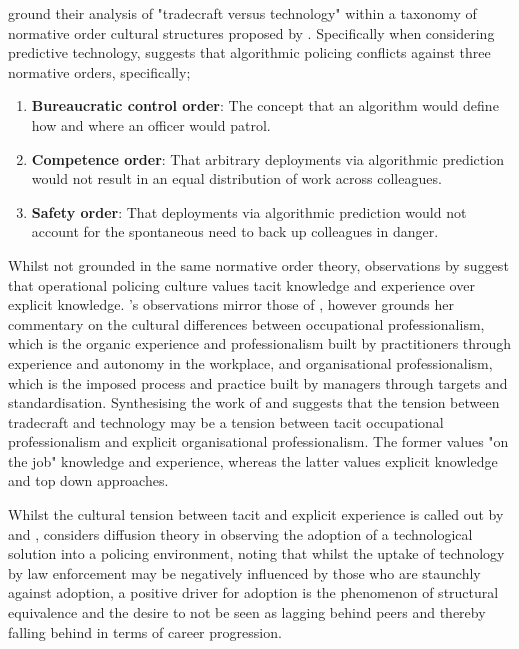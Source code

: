 \documentclass[12pt,a4paper,oneside]{report}
\begin{document}
\citet{ratcliffe2020conflicts} ground their analysis of "tradecraft versus technology" within a taxonomy of normative order cultural structures proposed by \citet{herbert1998police}.  Specifically when considering predictive technology, \citet{ratcliffe2020conflicts} suggests that algorithmic policing conflicts against three normative orders, specifically;
\newpage
\begin{enumerate}
  \item \textbf{Bureaucratic control order}: The concept that an algorithm would define how and where an officer would patrol.
  \item \textbf{Competence order}: That arbitrary deployments via algorithmic prediction would not result in an equal distribution of work across colleagues.
  \item \textbf{Safety order}: That deployments via algorithmic prediction would not account for the spontaneous need to back up colleagues in danger.
\end{enumerate}

Whilst not grounded in the same normative order theory, observations by \citet{gundhus2013experience} suggest that operational policing culture values tacit knowledge and experience over explicit knowledge.  \citet{gundhus2013experience}'s observations mirror those of \citet{ratcliffe2020conflicts}, however \citet{gundhus2013experience} grounds her commentary on the cultural differences between occupational professionalism, which is the organic experience and professionalism built by practitioners through experience and autonomy in the workplace, and organisational professionalism, which is the imposed process and practice built by managers through targets and standardisation.  Synthesising the work of \citet{ratcliffe2020conflicts} and \citet{gundhus2013experience} suggests that the tension between tradecraft and technology may be a tension between tacit occupational professionalism and explicit organisational professionalism.  The former values "on the job" knowledge and experience, whereas the latter values explicit knowledge and top down approaches.  

Whilst the cultural tension between tacit and explicit experience is called out by \citet{ratcliffe2020conflicts} and \citet{gundhus2013experience}, \citet{shih2026two} considers diffusion theory in observing the adoption of a technological solution into a policing environment, noting that whilst the uptake of technology by law enforcement may be negatively influenced by those who are staunchly against adoption, a positive driver for adoption is the phenomenon of structural equivalence and the desire to not be seen as lagging behind peers and thereby falling behind in terms of career progression.
\end{document}
